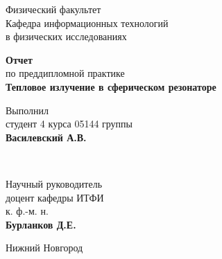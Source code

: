 \makeatletter
\begin{titlepage}

	\newpage

    \noindent{}

	\vspace*{50pt}

	Физический факультет \\[\baselineskip]

	Кафедра информационных технологий\\
	в физических исследованиях

	\vspace*{100pt}

	{\Large\textbf{Отчет}} \\
	по преддипломной практике \\[\baselineskip]

	{\Large\textbf{Тепловое излучение в сферическом резонаторе}}

	\vspace*{\fill}

	\hfill\begin{minipage}{15em}
    	Выполнил\\
		студент 4 курса 05144 группы\\
		\textbf{Василевский А.В.}
    \end{minipage} \\[\baselineskip]

	\hfill\begin{minipage}{15em}
    	Научный руководитель\\
		доцент кафедры ИТФИ\\
		к. ф.-м. н.\\
		\textbf{Бурланков Д.Е.}
    \end{minipage}

	\vspace*{\fill}

	Нижний Новгород\par


\end{titlepage}
\makeatother
